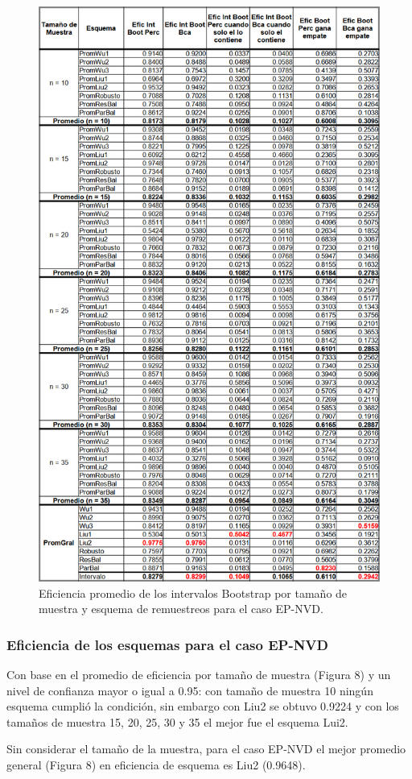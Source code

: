 \begin{figure}[ht] 
	\centering 
	\includegraphics[width=0.55\linewidth]{img/EP_NVD_Efic_Boots.png} 
	\caption{Eficiencia promedio de los intervalos Bootstrap por tamaño de muestra y esquema de remuestreos para el caso EP-NVD.} 
	\label{fig:EP_NVD_Boots}
\end{figure}
\FloatBarrier

\subsubsection{Eficiencia de los esquemas para el caso EP-NVD}
Con base en el promedio de eficiencia por tamaño de muestra (Figura 8) y un nivel de confianza mayor o igual a 0.95: con tamaño de muestra 10 ningún esquema cumplió la condición, sin embargo con Liu2 se obtuvo 0.9224 y con los tamaños de muestra 15, 20, 25, 30 y 35 el mejor fue el esquema Lui2.
\vspace{.5cm}

Sin considerar el tamaño de la muestra, para el caso EP-NVD el mejor promedio general (Figura 8) en eficiencia de esquema es Liu2 (0.9648).


